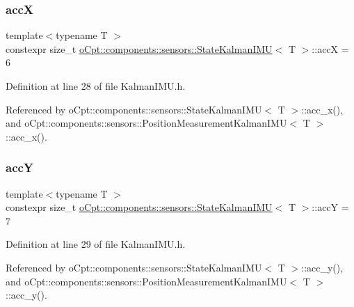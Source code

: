 \subsubsection{\texorpdfstring{accX}{accX}}
{\footnotesize\ttfamily template$<$typename T $>$ \\
constexpr size\+\_\+t \hyperlink{classo_cpt_1_1components_1_1sensors_1_1_state_kalman_i_m_u}{o\+Cpt\+::components\+::sensors\+::\+State\+Kalman\+I\+MU}$<$ T $>$\+::accX = 6\hspace{0.3cm}{\ttfamily [static]}}



Definition at line 28 of file Kalman\+I\+M\+U.\+h.



Referenced by o\+Cpt\+::components\+::sensors\+::\+State\+Kalman\+I\+M\+U$<$ T $>$\+::acc\+\_\+x(), and o\+Cpt\+::components\+::sensors\+::\+Position\+Measurement\+Kalman\+I\+M\+U$<$ T $>$\+::acc\+\_\+x().

\hypertarget{classo_cpt_1_1components_1_1sensors_1_1_state_kalman_i_m_u_ab9e11bcdaaf94eab84207043e747bb25}{}\label{classo_cpt_1_1components_1_1sensors_1_1_state_kalman_i_m_u_ab9e11bcdaaf94eab84207043e747bb25} 
\subsubsection{\texorpdfstring{accY}{accY}}
{\footnotesize\ttfamily template$<$typename T $>$ \\
constexpr size\+\_\+t \hyperlink{classo_cpt_1_1components_1_1sensors_1_1_state_kalman_i_m_u}{o\+Cpt\+::components\+::sensors\+::\+State\+Kalman\+I\+MU}$<$ T $>$\+::accY = 7\hspace{0.3cm}{\ttfamily [static]}}



Definition at line 29 of file Kalman\+I\+M\+U.\+h.



Referenced by o\+Cpt\+::components\+::sensors\+::\+State\+Kalman\+I\+M\+U$<$ T $>$\+::acc\+\_\+y(), and o\+Cpt\+::components\+::sensors\+::\+Position\+Measurement\+Kalman\+I\+M\+U$<$ T $>$\+::acc\+\_\+y().

\hypertarget{classo_cpt_1_1components_1_1sensors_1_1_state_kalman_i_m_u_ab1f138c868f75b567c7edcae5dd43028}{}\label{classo_cpt_1_1components_1_1sensors_1_1_state_kalman_i_m_u_ab1f138c868f75b567c7edcae5dd43028} 
